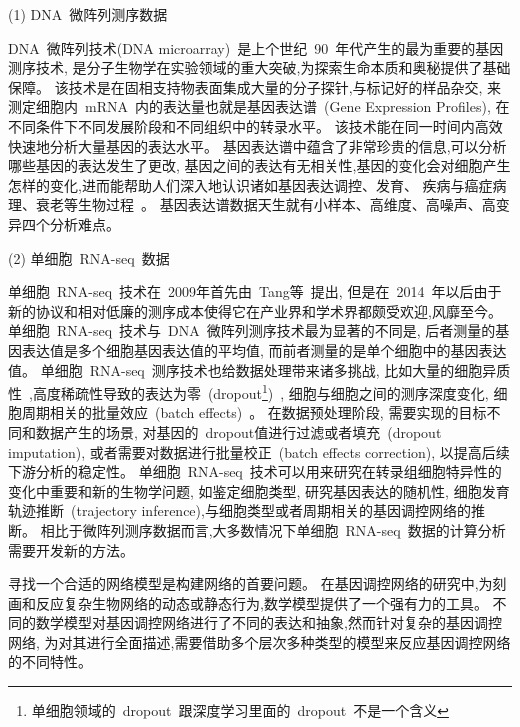 (1) DNA~微阵列测序数据


DNA~微阵列技术(DNA microarray)~是上个世纪~90~年代产生的最为重要的基因测序技术,
是分子生物学在实验领域的重大突破,为探索生命本质和奥秘提供了基础保障。
该技术是在固相支持物表面集成大量的分子探针,与标记好的样品杂交,
来测定细胞内~mRNA~内的表达量也就是基因表达谱~(Gene Expression Profiles),
在不同条件下不同发展阶段和不同组织中的转录水平。
该技术能在同一时间内高效快速地分析大量基因的表达水平。
基因表达谱中蕴含了非常珍贵的信息,可以分析哪些基因的表达发生了更改, 
基因之间的表达有无相关性,基因的变化会对细胞产生怎样的变化,进而能帮助人们深入地认识诸如基因表达调控、发育、
疾病与癌症病理、衰老等生物过程~\cite{chen2005selecting,shen2009new,camargo2008identification}。
基因表达谱数据天生就有小样本、高维度、高噪声、高变异四个分析难点。

(2) 单细胞~RNA-seq~数据

单细胞~RNA-seq~技术在~2009年首先由~Tang等~\cite{tang2009mrna}提出,
但是在~2014~年以后由于新的协议和相对低廉的测序成本使得它在产业界和学术界都颇受欢迎,风靡至今。
单细胞~RNA-seq~技术与~DNA~微阵列测序技术最为显著的不同是,
后者测量的基因表达值是多个细胞基因表达值的平均值,
而前者测量的是单个细胞中的基因表达值。
单细胞~RNA-seq~测序技术也给数据处理带来诸多挑战,
比如大量的细胞异质性~\cite{wagner2016revealing},高度稀疏性导致的表达为零~(dropout\footnote{单细胞领域的~dropout~跟深度学习里面的~dropout~不是一个含义})~\cite{vallejos2017normalizing}, 细胞与细胞之间的测序深度变化, 细胞周期相关的批量效应~(batch effects)~\cite{buettner2015computational}。
在数据预处理阶段, 需要实现的目标不同和数据产生的场景, 对基因的~dropout值进行过滤或者填充~(dropout imputation), 或者需要对数据进行批量校正~(batch effects correction), 以提高后续下游分析的稳定性。
单细胞~RNA-seq~技术可以用来研究在转录组细胞特异性的变化中重要和新的生物学问题,
如鉴定细胞类型, 研究基因表达的随机性, 细胞发育轨迹推断~(trajectory inference),与细胞类型或者周期相关的基因调控网络的推断。
相比于微阵列测序数据而言,大多数情况下单细胞~RNA-seq~数据的计算分析需要开发新的方法。

寻找一个合适的网络模型是构建网络的首要问题。
在基因调控网络的研究中,为刻画和反应复杂生物网络的动态或静态行为,数学模型提供了一个强有力的工具。
不同的数学模型对基因调控网络进行了不同的表达和抽象,然而针对复杂的基因调控网络,
为对其进行全面描述,需要借助多个层次多种类型的模型来反应基因调控网络的不同特性。

